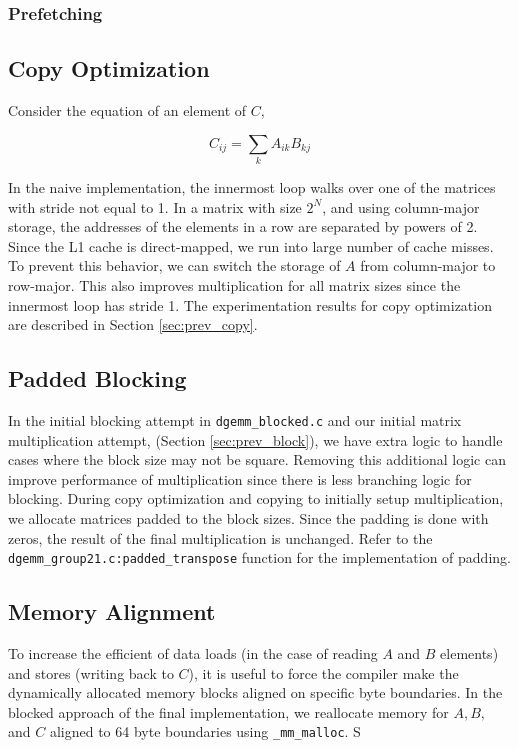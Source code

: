 \documentclass[11pt]{article}
\begin{document}
\subsubsection{Prefetching}


\subsection{Copy Optimization}\label{sec:copy_opt}
Consider the equation of an element of $C$,

\begin{equation}
	C_{ij} = \sum_k A_{ik} B_{kj}
\end{equation}

In the naive implementation, the innermost loop walks over one of the matrices with stride not equal to 1. In a matrix with size $2^N$, and using column-major storage, the addresses of the elements in a row are  separated by powers of 2. Since the L1 cache is direct-mapped, we run into large number of cache misses. \\


To prevent this behavior, we can switch the storage of $A$ from column-major to row-major. This also improves multiplication for all matrix sizes since the innermost loop has stride 1. The experimentation results for copy optimization are described in Section \ref{sec:prev_copy}.

\subsection{Padded Blocking}\label{sec:block}
In the initial blocking attempt in \texttt{dgemm\_blocked.c} and our initial matrix multiplication attempt, (Section \ref{sec:prev_block}), we have extra logic to handle cases where the block size may not be square. Removing this additional logic can improve performance of multiplication since there is less branching logic for blocking. During copy optimization and copying to initially setup multiplication, we allocate matrices padded to the block sizes. Since the padding is done with zeros, the result of the final multiplication is unchanged. Refer to the \texttt{dgemm\_group21.c:padded\_transpose} function for the implementation of padding. 

\subsection{Memory Alignment}\label{sec:align}
To increase the efficient of data loads (in the case of reading $A$ and $B$ elements) and stores (writing back to $C$), it is useful to force the compiler make the dynamically allocated memory blocks aligned on specific byte boundaries. \cite{vectorization} In the blocked approach of the final implementation, we reallocate memory for $A, B,$ and $C$ aligned to 64 byte boundaries using \texttt{\_mm\_malloc}. S
\end{document}
